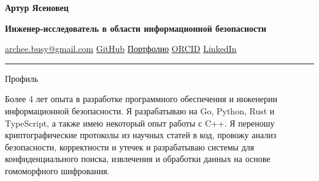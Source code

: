 \documentclass[11pt,a4paper]{article}
\newcommand{\cvrow}[2]{%
  \noindent
  \begin{minipage}[t]{0.145\textwidth}
    \vspace{0pt}%
    \raggedright
    \fontsize{10.5}{12.5}\selectfont
    #1
  \end{minipage}%
  \hfill
  \begin{minipage}[t]{0.835\textwidth}
    \vspace{0pt}%
    #2
  \end{minipage}\par
}
\begin{document}
{\fontsize{24}{28}\selectfont\bfseries Артур Ясеновец}\par
\vspace{0.08em}
{\large\bfseries Инженер-исследователь в области информационной безопасности}\par
\vspace{0.28em}
\href{mailto:archee.busy@gmail.com}{archee.busy@gmail.com}
\;\textbullet\;
\href{https://github.com/iasenovets}{GitHub}
\;\textbullet\;
\href{https://iasenovets.github.io/}{Портфолио}
\;\textbullet\;
\href{https://orcid.org/0009-0008-0008-3746}{ORCID}
\;\textbullet\;
\href{https://linkedin.com/in/iasenovets}{LinkedIn}
\par
\vspace{0.22em}
\hrule
\vspace{0.55em}

\cvrow{Профиль}{%
  Более 4 лет опыта в разработке программного обеспечения и инженерии
  информационной безопасности. Я разрабатываю на Go, Python, Rust и TypeScript,
  а также имею некоторый опыт работы с C++. Я переношу криптографические
  протоколы из научных статей в код, провожу анализ безопасности, корректности
  и утечек и разрабатываю системы для конфиденциального поиска, извлечения
  и обработки данных на основе гомоморфного шифрования.
}

\vspace{0.75em}
\end{document}
